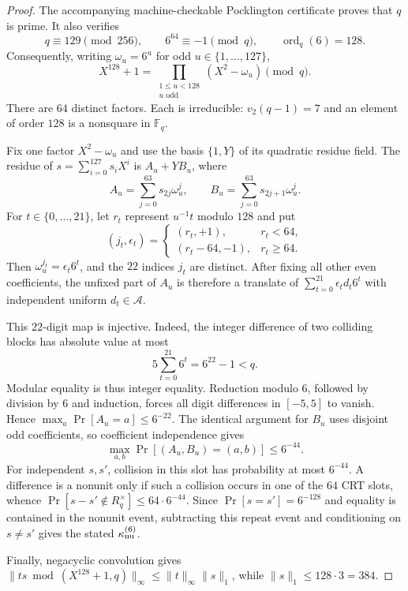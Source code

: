 \begin{proof}
The accompanying machine-checkable Pocklington certificate proves that $q$
is prime.  It also verifies
\[
 q\equiv129\pmod {256},\qquad
 6^{64}\equiv-1\pmod q,\qquad
 \operatorname{ord}_q(6)=128.
\]
Consequently, writing $\omega_u=6^u$ for odd $u\in\{1,\ldots,127\}$,
\[
 X^{128}+1=\prod_{\substack{1\le u<128\\u\text{ odd}}}(X^2-\omega_u)\pmod q.
\]
There are $64$ distinct factors.  Each is irreducible: $v_2(q-1)=7$ and an
element of order $128$ is a nonsquare in $\mathbb F_q$.

Fix one factor $X^2-\omega_u$ and use the basis $\{1,Y\}$ of its quadratic
residue field.  The residue of
$s=\sum_{i=0}^{127}s_iX^i$ is $A_u+YB_u$, where
\[
 A_u=\sum_{j=0}^{63}s_{2j}\omega_u^j,
 \qquad
 B_u=\sum_{j=0}^{63}s_{2j+1}\omega_u^j.
\]
For $t\in\{0,\ldots,21\}$, let $r_t$ represent $u^{-1}t$ modulo $128$ and
put
\[
 (j_t,\epsilon_t)=
 \begin{cases}
 (r_t,+1),&r_t<64,\\
 (r_t-64,-1),&r_t\ge64.
 \end{cases}
\]
Then $\omega_u^{j_t}=\epsilon_t6^t$, and the $22$ indices $j_t$ are
distinct.  After fixing all other even coefficients, the unfixed part of
$A_u$ is therefore a translate of
$\sum_{t=0}^{21}\epsilon_td_t6^t$ with independent uniform
$d_t\in\mathcal A$.

This $22$-digit map is injective.  Indeed, the integer difference of two
colliding blocks has absolute value at most
\[
 5\sum_{t=0}^{21}6^t=6^{22}-1<q.
\]
Modular equality is thus integer equality.  Reduction modulo $6$, followed by
division by $6$ and induction, forces all digit differences in $[-5,5]$ to
vanish.  Hence $\max_a\Pr[A_u=a]\le6^{-22}$.  The identical argument for
$B_u$ uses disjoint odd coefficients, so coefficient independence gives
\[
 \max_{a,b}\Pr[(A_u,B_u)=(a,b)]\le6^{-44}.
\]
For independent $s,s'$, collision in this slot has probability at most
$6^{-44}$.  A difference is a nonunit only if such a collision occurs in one
of the $64$ CRT slots, whence
$\Pr[s-s'\notin R_q^\times]\le64\cdot6^{-44}$.
Since $\Pr[s=s']=6^{-128}$ and equality is contained in the nonunit event,
subtracting this repeat event and conditioning on $s\ne s'$ gives the stated
$\kappa_{\rm nu}^{(6)}$.

Finally, negacyclic convolution gives
$\|ts\bmod(X^{128}+1,q)\|_\infty
 \le\|t\|_\infty\|s\|_1$, while
$\|s\|_1\le128\cdot3=384$.
\end{proof}

